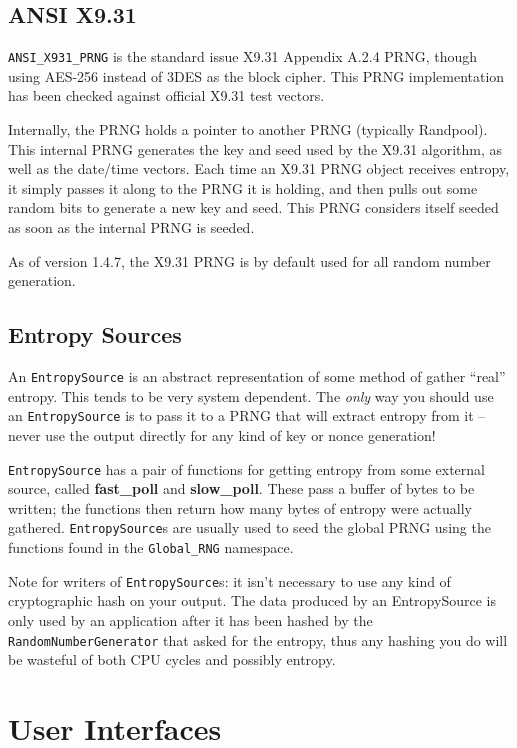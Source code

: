\documentclass{article}
\newcommand{\function}[1]{\textbf{#1}}
\newcommand{\type}[1]{\texttt{#1}}
\newcommand{\namespace}[1]{\texttt{#1}}
\begin{document}
\subsection{ANSI X9.31}

\type{ANSI\_X931\_PRNG} is the standard issue X9.31 Appendix A.2.4 PRNG, though
using AES-256 instead of 3DES as the block cipher. This PRNG implementation has
been checked against official X9.31 test vectors.

Internally, the PRNG holds a pointer to another PRNG (typically
Randpool). This internal PRNG generates the key and seed used by the
X9.31 algorithm, as well as the date/time vectors. Each time an X9.31
PRNG object receives entropy, it simply passes it along to the PRNG it
is holding, and then pulls out some random bits to generate a new key
and seed. This PRNG considers itself seeded as soon as the internal
PRNG is seeded.

As of version 1.4.7, the X9.31 PRNG is by default used for all random number
generation.

\subsection{Entropy Sources}

An \type{EntropySource} is an abstract representation of some method of gather
``real'' entropy. This tends to be very system dependent. The \emph{only} way
you should use an \type{EntropySource} is to pass it to a PRNG that will
extract entropy from it -- never use the output directly for any kind of key or
nonce generation!

\type{EntropySource} has a pair of functions for getting entropy from some
external source, called \function{fast\_poll} and \function{slow\_poll}. These
pass a buffer of bytes to be written; the functions then return how many bytes
of entropy were actually gathered. \type{EntropySource}s are usually used to
seed the global PRNG using the functions found in the \namespace{Global\_RNG}
namespace.

Note for writers of \type{EntropySource}s: it isn't necessary to use any kind
of cryptographic hash on your output. The data produced by an EntropySource is
only used by an application after it has been hashed by the
\type{RandomNumberGenerator} that asked for the entropy, thus any hashing
you do will be wasteful of both CPU cycles and possibly entropy.

\pagebreak
\section{User Interfaces}
\end{document}

